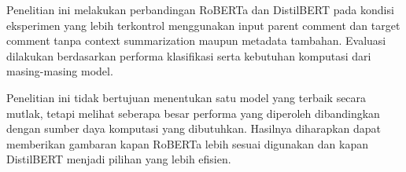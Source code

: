 Penelitian ini melakukan perbandingan RoBERTa dan DistilBERT pada kondisi eksperimen yang lebih terkontrol menggunakan input parent comment dan target comment tanpa context summarization maupun metadata tambahan. Evaluasi dilakukan berdasarkan performa klasifikasi serta kebutuhan komputasi dari masing-masing model.

Penelitian ini tidak bertujuan menentukan satu model yang terbaik secara mutlak, tetapi melihat seberapa besar performa yang diperoleh dibandingkan dengan sumber daya komputasi yang dibutuhkan. Hasilnya diharapkan dapat memberikan gambaran kapan RoBERTa lebih sesuai digunakan dan kapan DistilBERT menjadi pilihan yang lebih efisien.
